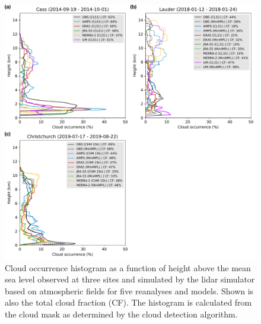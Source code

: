 \begin{figure}[p]
\centering
\includegraphics[width=\textwidth]{chapter3/fig/case_studies.pdf}
\caption[Cloud occurrence histogram as a function of height]{
Cloud occurrence histogram as a function of height above the mean sea level
observed at three sites and simulated by the lidar simulator based on atmospheric
fields for five reanalyses and models. Shown is also the total cloud fraction (CF).
The histogram is calculated from the cloud mask as determined by the cloud
detection algorithm.
}
\label{fig:3:case-studies}
\end{figure}

